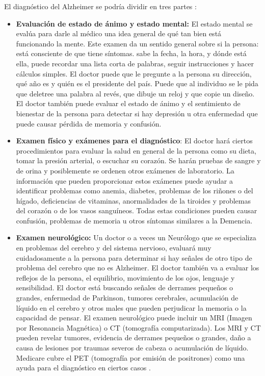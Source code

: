 El diagnóstico del Alzheimer se podría dividir en tres partes \cite{Diagnostico}:
\begin{itemize}
	\item \textbf{Evaluación de estado de ánimo y estado mental:} El estado mental se evalúa para darle al médico una idea general de qué tan bien está funcionando la mente. Este examen da un sentido general sobre si la persona: está consciente de que tiene síntomas. sabe la fecha, la hora, y dónde está ella, puede recordar una lista corta de palabras, seguir instrucciones y hacer cálculos simples. El doctor puede que le pregunte a la persona su dirección, qué año es y quién es el presidente del país. Puede que al individuo se le pida que deletree una palabra al revés, que dibuje un reloj y que copie un diseño. El doctor también puede evaluar el estado de ánimo y el sentimiento de bienestar de la persona para detectar si hay depresión u otra enfermedad que puede causar pérdida de memoria y confusión.
	\item \textbf{Examen físico y exámenes para el diagnóstico}: El doctor hará ciertos procedimientos para evaluar la salud en general de la persona como su dieta, tomar la presión arterial, o escuchar su corazón. Se harán pruebas de sangre y de orina y posiblemente se ordenen otros exámenes de laboratorio. La información que pueden proporcionar estos exámenes puede ayudar a identificar problemas como anemia, diabetes, problemas de los riñones o del hígado, deficiencias de vitaminas, anormalidades de la tiroides y problemas del corazón o de los vasos sanguíneos. Todas estas condiciones pueden causar confusión, problemas de memoria u otros síntomas similares a la Demencia.
	\item \textbf{Examen neurológico:} Un doctor o a veces un Neurólogo que se especializa en problemas del cerebro y del sistema nervioso, evaluará muy cuidadosamente a la persona para determinar si hay señales de otro tipo de problema del cerebro que no es Alzheimer. El doctor también va a evaluar los reflejos de la persona, el equilibrio, movimiento de los ojos, lenguaje y sensibilidad. El doctor está buscando señales de derrames pequeños o grandes, enfermedad de Parkinson, tumores cerebrales, acumulación de líquido en el cerebro y otros males que pueden perjudicar la memoria o la capacidad de pensar. El examen neurológico puede incluir un MRI (Imagen por Resonancia Magnética) o CT (tomografía computarizada). Los MRI y CT pueden revelar tumores, evidencia de derrames pequeños o grandes, daño a causa de lesiones por traumas severos de cabeza o acumulación de líquido. Medicare cubre el PET (tomografía por emisión de positrones) como una ayuda para el diagnóstico en ciertos casos .
\end{itemize}

